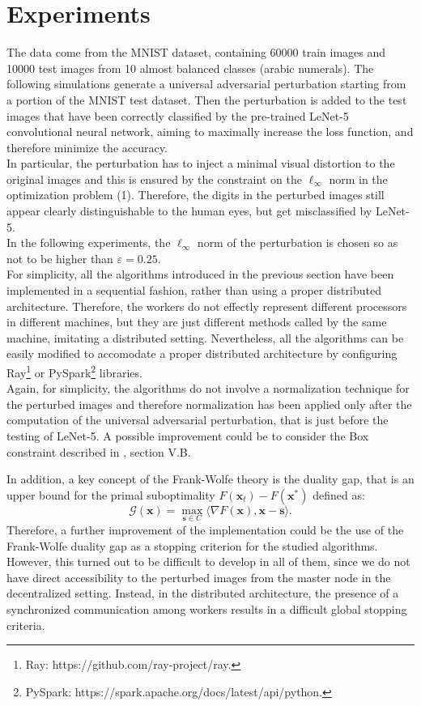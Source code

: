 \section{Experiments}
The data come from the MNIST dataset, containing 60000 train images and 10000 test images from 10 almost balanced classes (arabic numerals). The following simulations generate a universal adversarial perturbation starting from a portion of the MNIST test dataset. Then the perturbation is added to the test images that have been correctly classified by the pre-trained LeNet-5 convolutional neural network, aiming to maximally increase the loss function, and therefore minimize the accuracy.\\
\indent In particular, the perturbation has to inject a minimal visual distortion to the original images and this is ensured by the constraint on the $\ell_{\infty}$ norm in the optimization problem (1). Therefore, the digits in the perturbed images still appear clearly distinguishable to the human eyes, but get misclassified by LeNet-5.\\
\indent 
In the following experiments, the $\ell_{\infty}$ norm of the perturbation is chosen so as not to be higher than $\varepsilon=0.25$.\\

For simplicity, all the algorithms introduced in the previous section have been implemented in a sequential fashion, rather than using a proper distributed architecture. Therefore, the workers do not effectly represent different processors in different machines, but they are just different methods called by the same machine, imitating a distributed setting. Nevertheless, all the algorithms can be easily modified to accomodate a proper distributed architecture by configuring Ray\footnote{Ray: https://github.com/ray-project/ray.} or PySpark\footnote{PySpark: https://spark.apache.org/docs/latest/api/python.} libraries.\\

Again, for simplicity, the algorithms do not involve a normalization technique for the perturbed images and therefore normalization has been applied only after the computation of the universal adversarial perturbation, that is just before the testing of LeNet-5. A possible improvement could be to consider the Box constraint described in \cite{A1}, section V.B.\indent

In addition, a key concept of the Frank-Wolfe theory is the duality gap, that is an upper bound for the primal suboptimality $F(\mathbf{x}_t)-F(\mathbf{x}^*)$ defined as:
\begin{equation}
	\mathcal{G}(\mathbf{x}) =\max_{\mathbf{s}\in\mathit{C}} \langle \nabla F(\mathbf{x}),\mathbf{x}-\mathbf{s}\rangle.
\end{equation}
Therefore, a further improvement of the implementation could be the use of the Frank-Wolfe duality gap as a stopping criterion for the studied algorithms.\\ However, this turned out to be difficult to develop in all of them, since we do not have direct accessibility to the perturbed images from the master node in the decentralized setting. Instead, in the distributed architecture, the presence of a synchronized communication among workers results in a difficult global stopping criteria.